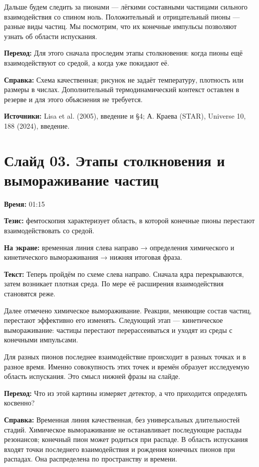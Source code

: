 \documentclass[11pt,a4paper]{article}
\begin{document}
Дальше будем следить за пионами — лёгкими составными частицами сильного взаимодействия со спином ноль. Положительный и отрицательный пионы — разные виды частиц. Мы посмотрим, что их конечные импульсы позволяют узнать об области испускания.

\textbf{Переход:} Для этого сначала проследим этапы столкновения: когда пионы ещё взаимодействуют со средой, а когда уже покидают её.

\textbf{Справка:} Схема качественная; рисунок не задаёт температуру, плотность или размеры в числах. Дополнительный термодинамический контекст оставлен в резерве и для этого объяснения не требуется.

\textbf{Источники:} Lisa et al. (2005), введение и §4; А. Краева (STAR), Universe 10, 188 (2024), введение.

\clearpage
\section*{Слайд 03. Этапы столкновения и вымораживание частиц}
\textbf{Время:} 01:15

\textbf{Тезис:} фемтоскопия характеризует область, в которой конечные пионы перестают взаимодействовать со средой.

\textbf{На экране:} временная линия слева направо → определения химического и кинетического вымораживания → нижняя итоговая фраза.

\textbf{Текст:} Теперь пройдём по схеме слева направо. Сначала ядра перекрываются, затем возникает плотная среда. По мере её расширения взаимодействия становятся реже.

Далее отмечено химическое вымораживание. Реакции, меняющие состав частиц, перестают эффективно его изменять. Следующий этап — кинетическое вымораживание: частицы перестают перерассеиваться и уходят из среды с конечными импульсами.

Для разных пионов последнее взаимодействие происходит в разных точках и в разное время. Именно совокупность этих точек и времён образует исследуемую область испускания. Это смысл нижней фразы на слайде.

\textbf{Переход:} Что из этой картины измеряет детектор, а что приходится определять косвенно?

\textbf{Справка:} Временная линия качественная, без универсальных длительностей стадий. Химическое вымораживание не останавливает последующие распады резонансов; конечный пион может родиться при распаде. В область испускания входят точки последнего взаимодействия и рождения конечных пионов при распадах. Она распределена по пространству и времени.
\end{document}
